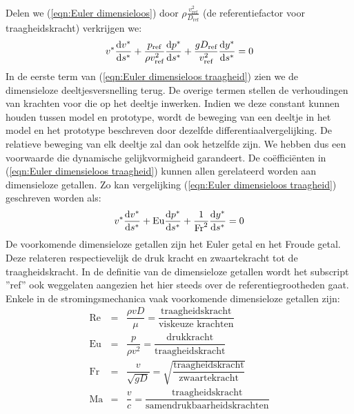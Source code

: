 \npar
Delen we (\ref{eqn:Euler dimensieloos}) door $\rho \frac{v_{\text{ref}}^2}{D_{\text{ref}}}$ (de referentiefactor voor traagheidskracht) verkrijgen we:
\begin{equation}
	v^* \frac{\mathrm{d} v^*}{\mathrm{d} s^*} + \frac{p_{\text{ref}}}{\rho v_{\text{ref}}^2} \frac{\mathrm{d} p^*}{\mathrm{d} s^*} + \frac{g D_{\text{ref}}}{v_{\text{ref}}^2}  \frac{\mathrm{d} y^*}{\mathrm{d} s^*} = 0
	\label{eqn:Euler dimensieloos traagheid}
\end{equation}
In de eerste term van (\ref{eqn:Euler dimensieloos traagheid}) zien we de dimensieloze deeltjesversnelling terug. De overige termen stellen de verhoudingen van krachten voor die op het deeltje inwerken. Indien we deze constant kunnen houden tussen model en prototype, wordt de beweging van een deeltje in het model en het prototype beschreven door dezelfde differentiaalvergelijking. De relatieve beweging van elk deeltje zal dan ook hetzelfde zijn. We hebben dus een voorwaarde die dynamische gelijkvormigheid garandeert.
\npar
De co\"effici\"enten in (\ref{eqn:Euler dimensieloos traagheid}) kunnen allen gerelateerd worden aan dimensieloze getallen. Zo kan vergelijking (\ref{eqn:Euler dimensieloos traagheid}) geschreven worden als:
\begin{equation}
	v^* \frac{\mathrm{d} v^*}{\mathrm{d} s^*} + \text{Eu} \frac{\mathrm{d} p^*}{\mathrm{d} s^*} + \frac{1}{\text{Fr}^2}  \frac{\mathrm{d} y^*}{\mathrm{d} s^*} = 0
	\label{eqn:Euler dimensieloze getallen}
\end{equation}
De voorkomende dimensieloze getallen zijn het Euler getal en het Froude getal. Deze relateren respectievelijk de druk kracht en zwaartekracht tot de traagheidskracht. In de definitie van de dimensieloze getallen wordt het subscript ''ref'' ook weggelaten aangezien het hier steeds over de referentiegrootheden gaat. Enkele in de stromingsmechanica vaak voorkomende dimensieloze getallen zijn:
\begin{eqnarray}
	\text{Re} &=& \dfrac{\rho v D}{\mu} = \dfrac{\text{traagheidskracht}}{\text{viskeuze krachten}} \label{eqn:Reynolds} \\
	\text{Eu} &=& \dfrac{p}{\rho v^2} = \dfrac{\text{drukkracht}}{\text{traagheidskracht}} \label{eqn:Euler} \\
	\text{Fr} &=& \dfrac{v}{\sqrt{g D}} = \sqrt{\dfrac{\text{traagheidskracht}}{\text{zwaartekracht}}} \\
	\text{Ma} &=& \dfrac{v}{c} = \dfrac{\text{traagheidskracht}}{\text{samendrukbaarheidskrachten}}
	\label{eqn:Dimensieloze getallen}
\end{eqnarray}
